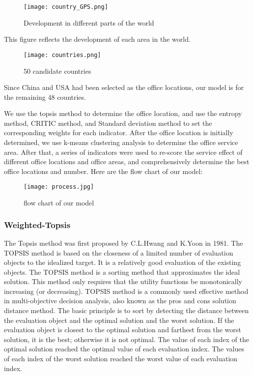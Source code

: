 \documentclass[12pt]{article}  %
\begin{document}
\begin{figure}[H]
	\centering
	\texttt{[image: country\_GPS.png]}
	\caption{Development in different parts of the world}\label{fig:cnt_GDP}
\end{figure}

This figure reflects the development of each area in the world.

\begin{figure}[H]
\centering
\texttt{[image: countries.png]}
\caption{50 candidate countries}\label{fig:cnt}
\end{figure}

Since China and USA had been selected as the office locations, our model is for the remaining 48 countries.

We use the topsis method to determine the office location, and use the entropy method, CRITIC method, and Standard deviation method to set the corresponding weights for each indicator. After the office location is initially determined, we use k-means clustering analysis to determine the office service area. After that, a series of indicators were used to re-score the service effect of different office locations and office areas, and comprehensively determine the best office locations and number. Here are the flow chart of our model:
\begin{figure}[H]
	\centering
	\texttt{[image: process.jpg]}
	\caption{flow chart of our model}\label{fig:flow_chart}
\end{figure}
\subsubsection{Weighted-Topsis}
The Topsis method was first proposed by C.L.Hwang and K.Yoon in 1981. The TOPSIS method is based on the closeness of a limited number of evaluation objects to the idealized target. It is a relatively good evaluation of the existing objects. The TOPSIS method is a sorting method that approximates the ideal solution. This method only requires that the utility functions be monotonically increasing (or decreasing). TOPSIS method is a commonly used effective method in multi-objective decision analysis, also known as the pros and cons solution distance method. The basic principle is to sort by detecting the distance between the evaluation object and the optimal solution and the worst solution. If the evaluation object is closest to the optimal solution and farthest from the worst solution, it is the best; otherwise it is not optimal. The value of each index of the optimal solution reached the optimal value of each evaluation index. The values ​​of each index of the worst solution reached the worst value of each evaluation index.
\end{document}
